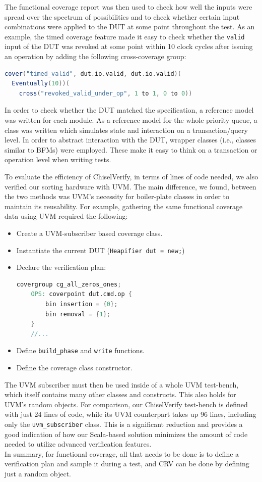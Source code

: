\documentclass[conference]{IEEEtran}
\begin{document}
The functional coverage report was then used to check how well the inputs were spread over the spectrum of possibilities and to check whether certain input combinations were applied to the DUT at some point throughout the test. 
As an example, the timed coverage feature made it easy to check whether the \texttt{valid} input of the DUT was revoked at some point within 10 clock cycles after issuing an operation by adding the following cross-coverage group:

\begin{lstlisting}[language=scala, caption={A timed cover construct.}, label={lst:timedcover}]
cover("timed_valid", dut.io.valid, dut.io.valid)(
  Eventually(10))(
    cross("revoked_valid_under_op", 1 to 1, 0 to 0))
\end{lstlisting}

In order to check whether the DUT matched the specification, a reference model was written for each module. 
As a reference model for the whole priority queue, a class was written which simulates state and interaction on a transaction/query level. In order to abstract interaction with the DUT, wrapper classes (i.e., classes similar to BFMs) were employed. 
These make it easy to think on a transaction or operation level when writing tests.

To evaluate the efficiency of ChiselVerify, in terms of lines of code needed, we also verified our sorting hardware with UVM.
The main difference, we found, between the two methods was UVM's necessity for boiler-plate classes in order to maintain its reusability.
For example, gathering the same functional coverage data using UVM required the following: 
\begin{itemize}
    \item Create a UVM-subscriber based coverage class.
    \item Instantiate the current DUT (\texttt{Heapifier dut = new;})
    \item Declare the verification plan: 
    \begin{lstlisting}[language=verilog]
	covergroup cg_all_zeros_ones;
	OPS: coverpoint dut.cmd.op {
		bin insertion = {0};
		bin removal = {1};
	}
	//...
    \end{lstlisting}
    \item Define \texttt{build\_phase} and \texttt{write} functions.
    \item Define the coverage class constructor.
\end{itemize}  
The UVM subscriber must then be used inside of a whole UVM test-bench, which itself contains many other classes and constructs.
This also holds for UVM's random objects.
For comparison, our ChiselVerify test-bench is defined with just 24 lines of code,
while its UVM counterpart takes up 96 lines, including only the \texttt{uvm\_subscriber} class.
This is a significant reduction and provides a good indication of how our Scala-based solution minimizes the amount of code needed to utilize advanced verification features. \\
In summary, for functional coverage, all that needs to be done is to define a verification plan and sample it during a test, and
CRV can be done by defining just a random object. 
\end{document}
